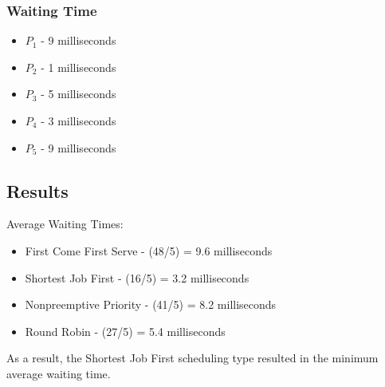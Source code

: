 \documentclass[letterpaper, 10pt,DIV=13]{scrartcl}
\numberwithin{equation}{section} %
\numberwithin{figure}{section} %
\numberwithin{table}{section} %
\begin{document}
\subsubsection{Waiting Time}
\begin{itemize}
    \item $P_1$ - 9 milliseconds
    \item $P_2$ - 1 milliseconds
    \item $P_3$ - 5 milliseconds
    \item $P_4$ - 3 milliseconds
    \item $P_5$ - 9 milliseconds
\end{itemize}

\subsection{Results}
Average Waiting Times:
\begin{itemize}
    \item First Come First Serve - (48/5) = 9.6 milliseconds
    \item Shortest Job First - (16/5) = 3.2 milliseconds
    \item Nonpreemptive Priority - (41/5) = 8.2 milliseconds
    \item Round Robin - (27/5) = 5.4 milliseconds
\end{itemize}

As a result, the Shortest Job First scheduling type resulted in the minimum average waiting time.
\end{document}
